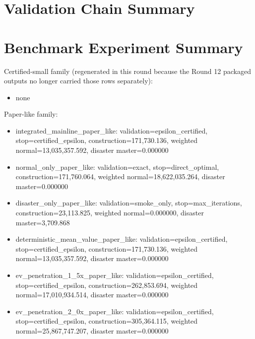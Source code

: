 \documentclass[11pt]{article}
\begin{document}
\section{Validation Chain Summary}


\section{Benchmark Experiment Summary}
Certified-small family (regenerated in this round because the Round 12 packaged outputs no longer carried those rows separately):
\begin{itemize}
\item none
\end{itemize}

Paper-like family:
\begin{itemize}
\item integrated\_mainline\_paper\_like: validation=epsilon\_certified, stop=certified\_epsilon, construction=171,730.136, weighted normal=13,035,357.592, disaster master=0.000000
\item normal\_only\_paper\_like: validation=exact, stop=direct\_optimal, construction=171,760.064, weighted normal=18,622,035.264, disaster master=0.000000
\item disaster\_only\_paper\_like: validation=smoke\_only, stop=max\_iterations, construction=23,113.825, weighted normal=0.000000, disaster master=3,709.868
\item deterministic\_mean\_value\_paper\_like: validation=epsilon\_certified, stop=certified\_epsilon, construction=171,730.136, weighted normal=13,035,357.592, disaster master=0.000000
\item ev\_penetration\_1\_5x\_paper\_like: validation=epsilon\_certified, stop=certified\_epsilon, construction=262,853.694, weighted normal=17,010,934.514, disaster master=0.000000
\item ev\_penetration\_2\_0x\_paper\_like: validation=epsilon\_certified, stop=certified\_epsilon, construction=305,364.115, weighted normal=25,867,747.207, disaster master=0.000000
\end{itemize}
\end{document}
